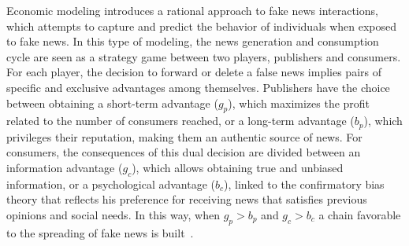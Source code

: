 \documentclass{ieeeaccess}
\begin{document}

Economic modeling introduces a rational approach to fake news interactions, which attempts to capture and predict the behavior of individuals when exposed to fake news. In this type of modeling, the news generation and consumption cycle are seen as a strategy game between two players, publishers and consumers. For each player, the decision to forward or delete a false news implies pairs of specific and exclusive advantages among themselves. Publishers have the choice between obtaining a short-term advantage ($g_{p}$), which maximizes the profit related to the number of consumers reached, or a long-term advantage ($ b_{p} $), which privileges their reputation, making them an authentic source of news. For consumers, the consequences of this dual decision are divided between an information advantage ($ g_{c} $), which allows obtaining true and unbiased information, or a psychological advantage ($ b_{c} $), linked to the confirmatory bias theory that reflects his preference for receiving news that satisfies previous opinions and social needs. In this way, when $ g_{p}> b_{p} $ and $ g_{c}> b_{c} $ a chain favorable to the spreading of fake news is built~\cite{shu2017fake}.
\end{document}
